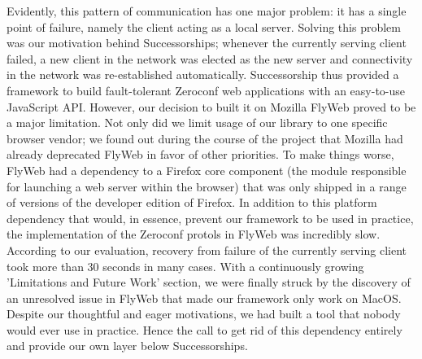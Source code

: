 Evidently, this pattern of communication has one major problem: it has a single point of failure, namely the client acting as a local server. 
Solving this problem was our motivation behind Successorships; whenever the currently serving client failed, a new client in the network was elected as the new server and connectivity in the network was re-established automatically.
Successorship thus provided a framework to build fault-tolerant Zeroconf web applications with an easy-to-use JavaScript API.
However, our decision to built it on Mozilla FlyWeb proved to be a major limitation.
Not only did we limit usage of our library to one specific browser vendor; we found out during the course of the project that Mozilla had already deprecated FlyWeb in favor of other priorities.
To make things worse, FlyWeb had a dependency to a Firefox core component (the module responsible for launching a web server within the browser) that was only shipped in a range of versions of the developer edition of Firefox.
In addition to this platform dependency that would, in essence, prevent our framework to be used in practice, the implementation of the Zeroconf protols in FlyWeb was incredibly slow.
According to our evaluation, recovery from failure of the currently serving client took more than 30 seconds in many cases.
With a continuously growing 'Limitations and Future Work' section, we were finally struck by the discovery of an unresolved issue in FlyWeb that made our framework only work on MacOS.
Despite our thoughtful and eager motivations, we had built a tool that nobody would ever use in practice.
Hence the call to get rid of this dependency entirely and provide our own layer below  Successorships.
